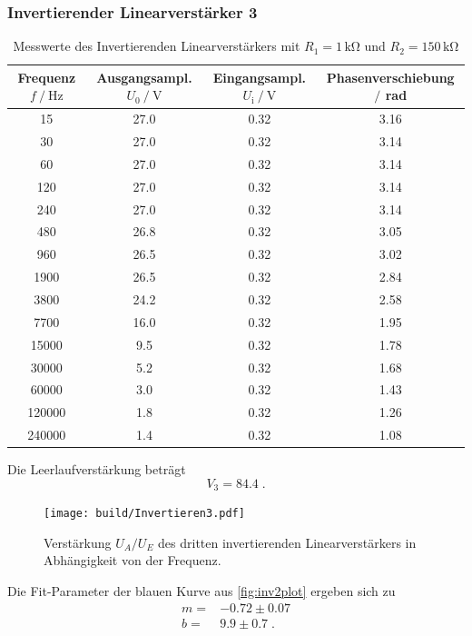 \subsubsection{Invertierender Linearverstärker 3}
\label{sec:InvertierenderLinearverstärker3}

\begin{table}
    \centering
    \caption{Messwerte des Invertierenden Linearverstärkers mit $R_1=1\,\unit{\kilo\ohm}$ und $R_2=150\,\unit{\kilo\ohm}$}
    \begin{tabular}{c c c c}
        \toprule
        Frequenz $f\mathbin{/}\unit{\hertz}$ & Ausgangsampl. $U_0\mathbin{/}\unit{\volt}$& Eingangsampl. $U_{\text{i}}\mathbin{/}\unit{\volt}$ & Phasenverschiebung $\mathbin{/}$ rad\\
        \midrule
        15& 27.0&	0.32&	3.16\\		
        30&	27.0&	0.32&	3.14\\		
        60&	27.0&	0.32&	3.14\\		
        120&	27.0&	0.32&	3.14\\		
        240&	27.0&	0.32&	3.14\\		
        480&	26.8&	0.32&	3.05\\		
        960&	26.5&	0.32&	3.02\\		
        1900&	26.5&	0.32&	2.84\\	
        3800&	24.2&	0.32&	2.58\\	
        7700&	16.0&	0.32&	1.95\\	
        15000&	9.5&	0.32&	1.78\\		
        30000&	5.2&	0.32&	1.68\\		
        60000&	3.0&	0.32&	1.43\\	
        120000&	1.8&	0.32&	1.26\\	
        240000&	1.4&	0.32& 1.08	\\
        \bottomrule
    \end{tabular}
    \label{tab:InvAmp3}
\end{table}
Die Leerlaufverstärkung beträgt
\begin{equation*}
    V_3= 84.4\; .
\end{equation*}

\begin{figure}
    \centering
    \texttt{[image: build/Invertieren3.pdf]}
    \caption{Verstärkung $U_A/U_E$ des dritten invertierenden Linearverstärkers in Abhängigkeit von der Frequenz.}
    \label{fig:inv3plot}
\end{figure}
Die Fit-Parameter der blauen Kurve aus \autoref{fig:inv2plot} ergeben sich zu
\begin{align*}
    m=&-0.72\pm 0.07 \\
    b=& 9.9\pm 0.7\; .
\end{align*}

